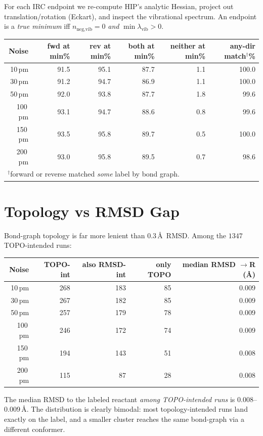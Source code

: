 \documentclass[11pt]{article}
\begin{document}
For each IRC endpoint we re-compute HIP's analytic Hessian, project out
translation/rotation (Eckart), and inspect the vibrational spectrum.
An endpoint is a \emph{true minimum} iff $n_{\text{neg,vib}} = 0$
\emph{and} $\min \lambda_{\text{vib}} > 0$.

\begin{center}
\begin{tabular}{rrrrrr}
\toprule
Noise & fwd at min\% & rev at min\% & both at min\% & neither at min\% & any-dir match$^\dagger$\% \\
\midrule
10\,pm  & 91.5 & 95.1 & 87.7 & 1.1 & 100.0 \\
30\,pm  & 91.2 & 94.7 & 86.9 & 1.1 & 100.0 \\
50\,pm  & 92.0 & 93.8 & 87.7 & 1.8 & 99.6 \\
100\,pm & 93.1 & 94.7 & 88.6 & 0.8 & 99.6 \\
150\,pm & 93.5 & 95.8 & 89.7 & 0.5 & 100.0 \\
200\,pm & 93.0 & 95.8 & 89.5 & 0.7 & 98.6 \\
\bottomrule
\multicolumn{6}{l}{\small $^\dagger$forward or reverse matched \emph{some} label by bond graph.}
\end{tabular}
\end{center}

\section*{Topology vs RMSD Gap}

Bond-graph topology is far more lenient than 0.3\,\AA\ RMSD. Among the
$1347$ TOPO-intended runs:

\begin{center}
\begin{tabular}{rrrrr}
\toprule
Noise & TOPO-int & also RMSD-int & only TOPO & median RMSD $\to$R (\AA) \\
\midrule
10\,pm  & 268 & 183 & 85 & 0.009 \\
30\,pm  & 267 & 182 & 85 & 0.009 \\
50\,pm  & 257 & 179 & 78 & 0.009 \\
100\,pm & 246 & 172 & 74 & 0.009 \\
150\,pm & 194 & 143 & 51 & 0.008 \\
200\,pm & 115 &  87 & 28 & 0.008 \\
\bottomrule
\end{tabular}
\end{center}

The median RMSD to the labeled reactant \emph{among TOPO-intended runs} is
0.008--0.009\,\AA. The distribution is clearly bimodal: most topology-intended
runs land exactly on the label, and a smaller cluster reaches the same
bond-graph via a different conformer.
\end{document}
